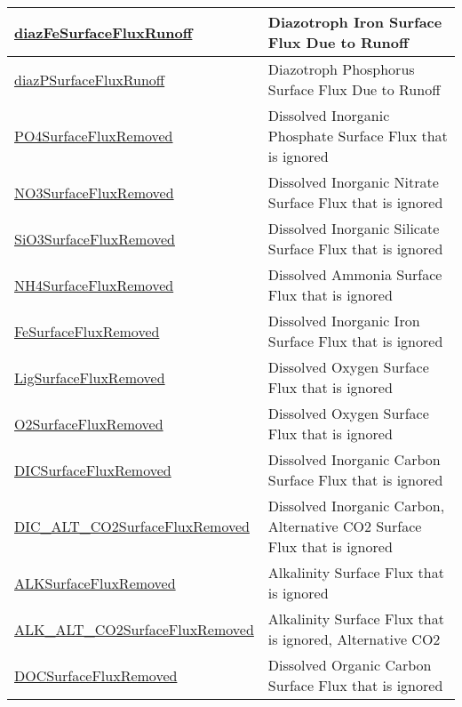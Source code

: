 {\begin{center}
\begin{longtable}{| p{2.0in} | p{4.0in} |}
    \hline
    \hyperref[subsec:var_sec_forcing_diazFeSurfaceFluxRunoff]{diazFeSurfaceFluxRunoff} & Diazotroph Iron Surface Flux Due to Runoff \\
    \hline
    \hyperref[subsec:var_sec_forcing_diazPSurfaceFluxRunoff]{diazPSurfaceFluxRunoff} & Diazotroph Phosphorus Surface Flux Due to Runoff \\
    \hline
    \hyperref[subsec:var_sec_forcing_PO4SurfaceFluxRemoved]{PO4SurfaceFluxRemoved} & Dissolved Inorganic Phosphate Surface Flux that is ignored \\
    \hline
    \hyperref[subsec:var_sec_forcing_NO3SurfaceFluxRemoved]{NO3SurfaceFluxRemoved} & Dissolved Inorganic Nitrate Surface Flux that is ignored \\
    \hline
    \hyperref[subsec:var_sec_forcing_SiO3SurfaceFluxRemoved]{SiO3SurfaceFluxRemoved} & Dissolved Inorganic Silicate Surface Flux that is ignored \\
    \hline
    \hyperref[subsec:var_sec_forcing_NH4SurfaceFluxRemoved]{NH4SurfaceFluxRemoved} & Dissolved Ammonia Surface Flux that is ignored \\
    \hline
    \hyperref[subsec:var_sec_forcing_FeSurfaceFluxRemoved]{FeSurfaceFluxRemoved} & Dissolved Inorganic Iron Surface Flux that is ignored \\
    \hline
    \hyperref[subsec:var_sec_forcing_LigSurfaceFluxRemoved]{LigSurfaceFluxRemoved} & Dissolved Oxygen Surface Flux that is ignored \\
    \hline
    \hyperref[subsec:var_sec_forcing_O2SurfaceFluxRemoved]{O2SurfaceFluxRemoved} & Dissolved Oxygen Surface Flux that is ignored \\
    \hline
    \hyperref[subsec:var_sec_forcing_DICSurfaceFluxRemoved]{DICSurfaceFluxRemoved} & Dissolved Inorganic Carbon Surface Flux that is ignored \\
    \hline
    \hyperref[subsec:var_sec_forcing_DIC_ALT_CO2SurfaceFluxRemoved]{DIC\_ALT\_CO2SurfaceFlux\-Removed} & Dissolved Inorganic Carbon, Alternative CO2 Surface Flux that is ignored \\
    \hline
    \hyperref[subsec:var_sec_forcing_ALKSurfaceFluxRemoved]{ALKSurfaceFluxRemoved} & Alkalinity Surface Flux that is ignored \\
    \hline
    \hyperref[subsec:var_sec_forcing_ALK_ALT_CO2SurfaceFluxRemoved]{ALK\_ALT\_CO2SurfaceFlux\-Removed} & Alkalinity Surface Flux that is ignored, Alternative CO2 \\
    \hline
    \hyperref[subsec:var_sec_forcing_DOCSurfaceFluxRemoved]{DOCSurfaceFluxRemoved} & Dissolved Organic Carbon Surface Flux that is ignored \\

\end{longtable}
\end{center}}
